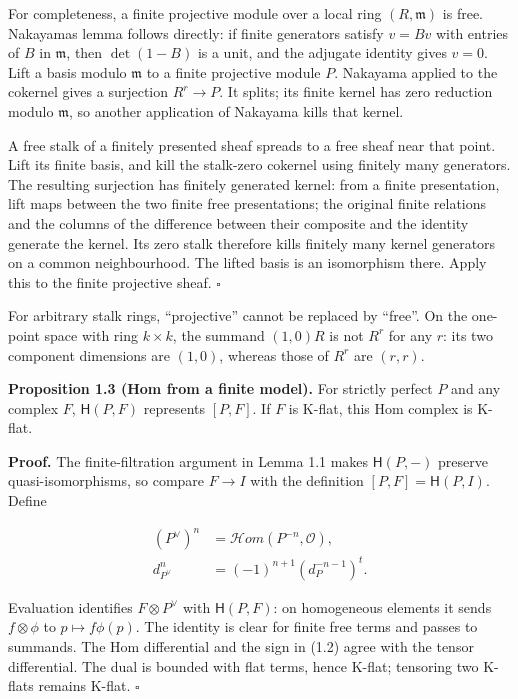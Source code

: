 \documentclass[
  english,
  11pt,
  a4paper,
]{article}
\begin{document}
For completeness, a finite projective module over a local ring
\((R,\mathfrak m)\) is free. Nakayama\textquotesingle s lemma follows
directly: if finite generators satisfy \(v=Bv\) with entries of \(B\) in
\(\mathfrak m\), then \(\det(1-B)\) is a unit, and the adjugate identity
gives \(v=0\). Lift a basis modulo \(\mathfrak m\) to a finite
projective module \(P\). Nakayama applied to the cokernel gives a
surjection \(R^r\to P\). It splits; its finite kernel has zero reduction
modulo \(\mathfrak m\), so another application of Nakayama kills that
kernel.

A free stalk of a finitely presented sheaf spreads to a free sheaf near
that point. Lift its finite basis, and kill the stalk-zero cokernel
using finitely many generators. The resulting surjection has finitely
generated kernel: from a finite presentation, lift maps between the two
finite free presentations; the original finite relations and the columns
of the difference between their composite and the identity generate the
kernel. Its zero stalk therefore kills finitely many kernel generators
on a common neighbourhood. The lifted basis is an isomorphism there.
Apply this to the finite projective sheaf. \(\square\)

For arbitrary stalk rings, ``projective'' cannot be replaced by
``free''. On the one-point space with ring \(k\times k\), the summand
\((1,0)R\) is not \(R^r\) for any \(r\): its two component dimensions
are \((1,0)\), whereas those of \(R^r\) are \((r,r)\).

\textbf{Proposition 1.3 (Hom from a finite model).} For strictly perfect
\(P\) and any complex \(F\), \(\mathsf H(P,F)\) represents \([P,F]\). If
\(F\) is K-flat, this Hom complex is K-flat.

\textbf{Proof.} The finite-filtration argument in Lemma 1.1 makes
\(\mathsf H(P,-)\) preserve quasi-isomorphisms, so compare \(F\to I\)
with the definition \([P,F]=\mathsf H(P,I)\). Define

\[\begin{aligned}
(P^\vee)^n&=\mathcal Hom(P^{-n},\mathcal O),\\
d_{P^\vee}^n&=(-1)^{n+1}(d_P^{-n-1})^t.
\end{aligned}
\tag{1.2}\]

Evaluation identifies \(F\otimes P^\vee\) with \(\mathsf H(P,F)\): on
homogeneous elements it sends \(f\otimes\phi\) to \(p\mapsto f\phi(p)\).
The identity is clear for finite free terms and passes to summands. The
Hom differential and the sign in (1.2) agree with the tensor
differential. The dual is bounded with flat terms, hence K-flat;
tensoring two K-flats remains K-flat. \(\square\)
\end{document}
